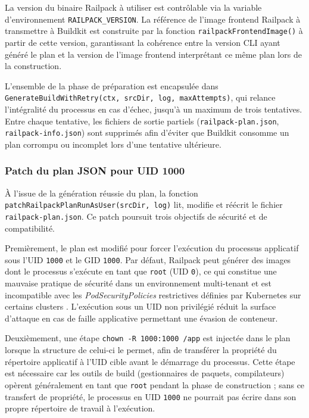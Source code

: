 La version du binaire Railpack à utiliser est contrôlable via la variable d'environnement \texttt{RAILPACK\_VERSION}. La référence de l'image frontend Railpack à transmettre à Buildkit est construite par la fonction \texttt{railpackFrontendImage()} à partir de cette version, garantissant la cohérence entre la version CLI ayant généré le plan et la version de l'image frontend interprétant ce même plan lors de la construction.

L'ensemble de la phase de préparation est encapsulée dans \texttt{GenerateBuildWithRetry(ctx, srcDir, log, maxAttempts)}, qui relance l'intégralité du processus en cas d'échec, jusqu'à un maximum de trois tentatives. Entre chaque tentative, les fichiers de sortie partiels (\texttt{railpack-plan.json}, \texttt{railpack-info.json}) sont supprimés afin d'éviter que Buildkit consomme un plan corrompu ou incomplet lors d'une tentative ultérieure.

\subsubsection*{Patch du plan JSON pour UID 1000}

À l'issue de la génération réussie du plan, la fonction \texttt{patchRailpackPlanRunAsUser(srcDir, log)} lit, modifie et réécrit le fichier \texttt{railpack-plan.json}. Ce patch poursuit trois objectifs de sécurité et de compatibilité.

Premièrement, le plan est modifié pour forcer l'exécution du processus applicatif sous l'UID \texttt{1000} et le GID \texttt{1000}. Par défaut, Railpack peut générer des images dont le processus s'exécute en tant que \texttt{root} (UID \texttt{0}), ce qui constitue une mauvaise pratique de sécurité dans un environnement multi-tenant et est incompatible avec les \textit{PodSecurityPolicies} restrictives définies par Kubernetes sur certains clusters \cite{k8s-security-context}. L'exécution sous un UID non privilégié réduit la surface d'attaque en cas de faille applicative permettant une évasion de conteneur.

Deuxièmement, une étape \texttt{chown -R 1000:1000 /app} est injectée dans le plan lorsque la structure de celui-ci le permet, afin de transférer la propriété du répertoire applicatif à l'UID cible avant le démarrage du processus. Cette étape est nécessaire car les outils de build (gestionnaires de paquets, compilateurs) opèrent généralement en tant que \texttt{root} pendant la phase de construction ; sans ce transfert de propriété, le processus en UID \texttt{1000} ne pourrait pas écrire dans son propre répertoire de travail à l'exécution.

